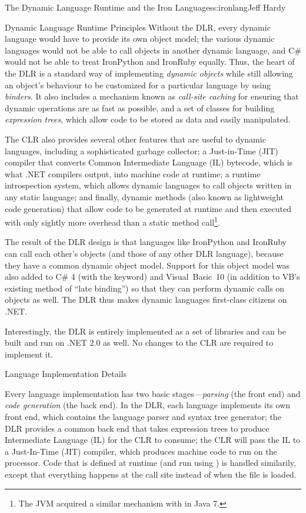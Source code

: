 \begin{aosachapter}{The Dynamic Language Runtime and the Iron Languages}{s:ironlang}{Jeff Hardy}
\begin{aosasect1}{Dynamic Language Runtime Principles}
Without the DLR, every dynamic language would have to provide its own object
model; the various dynamic languages would not be able to call objects in
another dynamic language, and C\# would not be able to treat IronPython and
IronRuby equally. Thus, the heart of the DLR is a standard way of implementing
\emph{dynamic objects} while still allowing an object's behaviour to be
customized for a particular language by using \emph{binders}. It also includes
a mechanism known as \emph{call-site caching} for ensuring that dynamic
operations are as fast as possible, and a set of classes for building
\emph{expression trees}, which allow code to be stored as data and easily
manipulated.

The CLR also provides several other features that are useful to dynamic
languages, including a sophisticated garbage collector; a Just-in-Time (JIT)
compiler that converts Common Intermediate Language (IL) bytecode, which is
what .NET compilers output, into machine code at runtime; a runtime
introspection system, which allows dynamic languages to call objects written in
any static language; and finally, dynamic methods (also known as lightweight
code generation) that allow code to be generated at runtime and then executed
with only sightly more overhead than a static method call\footnote{The JVM
acquired a similar mechanism with  in Java 7.}.

The result of the DLR design is that languages like IronPython and IronRuby can
call each other's objects (and those of any other DLR language), because they
have a common dynamic object model. Support for this object model was also
added to C\# 4 (with the  keyword) and Visual~Basic~10 (in
addition to VB's existing method of ``late binding'') so that they can perform
dynamic calls on objects as well. The DLR thus makes dynamic languages
first-class citizens on .NET.

Interestingly, the DLR is entirely implemented as a set of libraries and can be
built and run on .NET 2.0 as well. No changes to the CLR are required to
implement it.

\end{aosasect1}

\begin{aosasect1}{Language Implementation Details}

Every language implementation has two basic stages---\emph{parsing} (the
front end) and \emph{code generation} (the back end). In the DLR, each language
implements its own front end, which contains the language parser and syntax tree
generator; the DLR provides a common back end that takes expression trees to
produce Intermediate Language (IL) for the CLR to consume; the CLR will pass
the IL to a Just-In-Time (JIT) compiler, which produces machine code to run on
the processor. Code that is defined at runtime (and run using ) is
handled similarily, except that everything happens at the  call site
instead of when the file is loaded.


\end{aosasect1}
\end{aosachapter}
